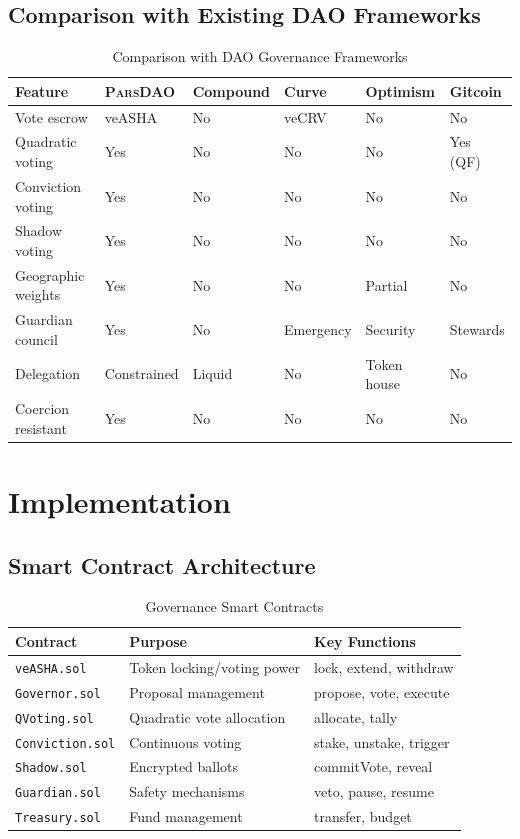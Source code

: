 \documentclass[11pt,a4paper]{article}
\newcommand{\parsdao}{\textsc{ParsDAO}\xspace}
\begin{document}
\subsection{Comparison with Existing DAO Frameworks}

\begin{table}[H]
\centering
\caption{Comparison with DAO Governance Frameworks}
\label{tab:dao-compare}
\begin{tabularx}{\textwidth}{lXXXXX}
\toprule
\textbf{Feature} & \textbf{\parsdao} & \textbf{Compound} & \textbf{Curve} & \textbf{Optimism} & \textbf{Gitcoin} \\
\midrule
Vote escrow & veASHA & No & veCRV & No & No \\
Quadratic voting & Yes & No & No & No & Yes (QF) \\
Conviction voting & Yes & No & No & No & No \\
Shadow voting & Yes & No & No & No & No \\
Geographic weights & Yes & No & No & Partial & No \\
Guardian council & Yes & No & Emergency & Security & Stewards \\
Delegation & Constrained & Liquid & No & Token house & No \\
Coercion resistant & Yes & No & No & No & No \\
\bottomrule
\end{tabularx}
\end{table}

\section{Implementation}

\subsection{Smart Contract Architecture}

\begin{table}[H]
\centering
\caption{Governance Smart Contracts}
\label{tab:contracts}
\begin{tabular}{lll}
\toprule
\textbf{Contract} & \textbf{Purpose} & \textbf{Key Functions} \\
\midrule
\texttt{veASHA.sol} & Token locking/voting power & lock, extend, withdraw \\
\texttt{Governor.sol} & Proposal management & propose, vote, execute \\
\texttt{QVoting.sol} & Quadratic vote allocation & allocate, tally \\
\texttt{Conviction.sol} & Continuous voting & stake, unstake, trigger \\
\texttt{Shadow.sol} & Encrypted ballots & commitVote, reveal \\
\texttt{Guardian.sol} & Safety mechanisms & veto, pause, resume \\
\texttt{Treasury.sol} & Fund management & transfer, budget \\
\bottomrule
\end{tabular}
\end{table}
\end{document}
